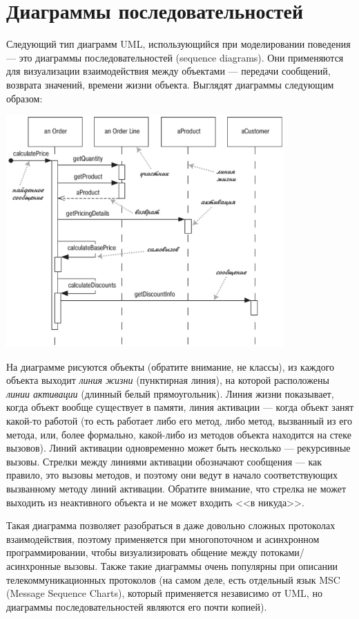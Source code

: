 \documentclass{../../text-style}
\begin{document}
\section{Диаграммы последовательностей}

Следующий тип диаграмм UML, использующийся при моделировании поведения --- это диаграммы последовательностей (sequence diagrams). Они применяются для визуализации взаимодействия между объектами --- передачи сообщений, возврата значений, времени жизни объекта. Выглядят диаграммы следующим образом:

\begin{center}
    \includegraphics[width=0.8\textwidth]{sequenceDiagram.png}
\end{center}

На диаграмме рисуются объекты (обратите внимание, не классы), из каждого объекта выходит \textit{линия жизни} (пунктирная линия), на которой расположены \textit{линии активации} (длинный белый прямоугольник). Линия жизни показывает, когда объект вообще существует в памяти, линия активации --- когда объект занят какой-то работой (то есть работает либо его метод, либо метод, вызванный из его метода, или, более формально, какой-либо из методов объекта находится на стеке вызовов). Линий активации одновременно может быть несколько --- рекурсивные вызовы. Стрелки между линиями активации обозначают сообщения --- как правило, это вызовы методов, и поэтому они ведут в начало соответствующих вызванному методу линий активации. Обратите внимание, что стрелка не может выходить из неактивного объекта и не может входить <<в никуда>>.

Такая диаграмма позволяет разобраться в даже довольно сложных протоколах взаимодействия, поэтому применяется при многопоточном и асинхронном программировании, чтобы визуализировать общение между потоками/асинхронные вызовы. Также такие диаграммы очень популярны при описании телекоммуникационных протоколов (на самом деле, есть отдельный язык MSC (Message Sequence Charts), который применяется независимо от UML, но диаграммы последовательностей являются его почти копией).
\end{document}

